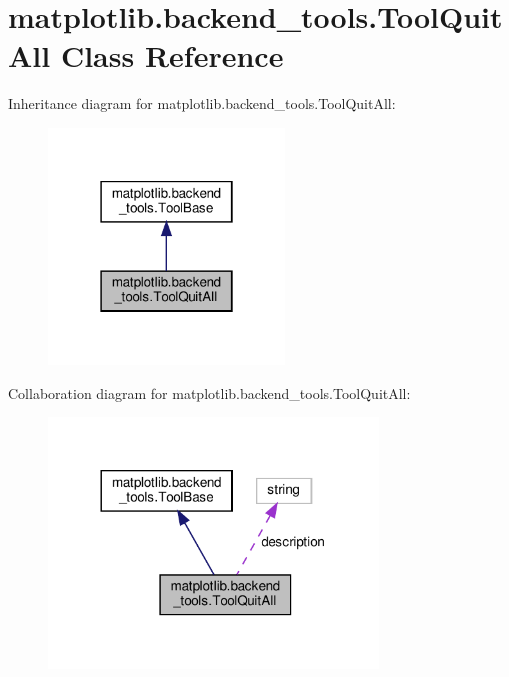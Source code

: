 \hypertarget{classmatplotlib_1_1backend__tools_1_1ToolQuitAll}{}\section{matplotlib.\+backend\+\_\+tools.\+Tool\+Quit\+All Class Reference}
\label{classmatplotlib_1_1backend__tools_1_1ToolQuitAll}


Inheritance diagram for matplotlib.\+backend\+\_\+tools.\+Tool\+Quit\+All\+:
\nopagebreak
\begin{figure}[H]
\begin{center}
\leavevmode
\includegraphics[width=178pt]{classmatplotlib_1_1backend__tools_1_1ToolQuitAll__inherit__graph}
\end{center}
\end{figure}


Collaboration diagram for matplotlib.\+backend\+\_\+tools.\+Tool\+Quit\+All\+:
\nopagebreak
\begin{figure}[H]
\begin{center}
\leavevmode
\includegraphics[width=248pt]{classmatplotlib_1_1backend__tools_1_1ToolQuitAll__coll__graph}
\end{center}
\end{figure}
